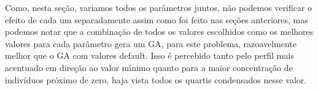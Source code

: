 \documentclass[12pt]{article}
\begin{document}
Como, nesta seção, variamos todos os parâmetros juntos, não podemos verificar o efeito de cada um separadamente assim como foi feito nas seções anteriores, mas podemos notar que a combinação de todos os valores escolhidos como os melhores valores para cada parâmetro gera um GA, para este problema, razoavelmente melhor que o GA com valores default. Isso é percebido tanto pelo perfil mais acentuado em direção ao valor mínimo quanto para a maior concentração de indivíduos próximo de zero, haja vista todos os quartis condensados nesse valor.
\end{document}

